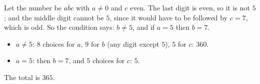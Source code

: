 Let the number be $\overline{abc}$ with $a\ne0$ and $c$ even. The last digit is even, so it is not $5$; and the middle digit cannot be $5$, since it would have to be followed by $c=7$, which is odd. So the condition says: $b\ne5$, and if $a=5$ then $b=7$.
\begin{itemize}
\item $a\ne5$: $8$ choices for $a$, $9$ for $b$ (any digit except $5$), $5$ for $c$: $360$.
\item $a=5$: then $b=7$, and $5$ choices for $c$: $5$.
\end{itemize}
The total is $\boxed{365}$.
